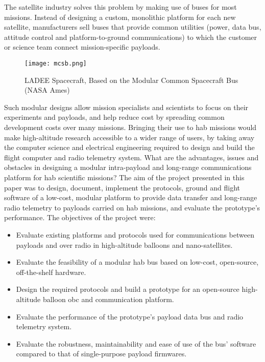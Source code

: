 The satellite industry solves this problem by making use of buses for most missions. Instead of designing a custom, monolithic platform for each new satellite, manufacturers sell buses that provide common utilities (power, data bus, attitude control and platform-to-ground communications) to which the customer or science team connect mission-specific payloads.

\begin{figure}[H]
\texttt{[image: mcsb.png]}
\centering
\caption{LADEE Spacecraft, Based on the Modular Common Spacecraft Bus (NASA
Ames)}
\end{figure}

Such modular designs allow mission specialists and scientists to focus on their experiments and payloads, and help reduce cost by spreading common development costs over many missions. Bringing their use to \acrshort{hab} missions would make high-altitude research accessible to a wider range of users, by taking away the computer science and electrical engineering required to design and build the flight computer and radio telemetry system.
\vskip 0.5cm
What are the advantages, issues and obstacles in designing a modular intra-payload and long-range communications platform for \acrlong{hab} scientific missions? The aim of the project presented in this paper was to design, document, implement the protocols, ground and flight software of a low-cost, modular platform to provide data transfer and long-range radio telemetry to payloads carried on \acrlong{hab} missions, and evaluate the prototype's performance. The objectives of the project were:

\begin{itemize}
\item Evaluate existing platforms and protocols used for communications between
payloads and over radio in high-altitude balloons and nano-satellites.

\item Evaluate the feasibility of a modular \acrlong{hab} bus based on low-cost, open-source, off-the-shelf hardware.

\item Design the required protocols and build a prototype for an open-source high-altitude balloon \acrlong{obc} and communication platform.

\item Evaluate the performance of the prototype's payload data bus and radio telemetry system.

\item Evaluate the robustness, maintainability and ease of use of the bus' software compared to that of single-purpose payload firmwares.
\end{itemize}

